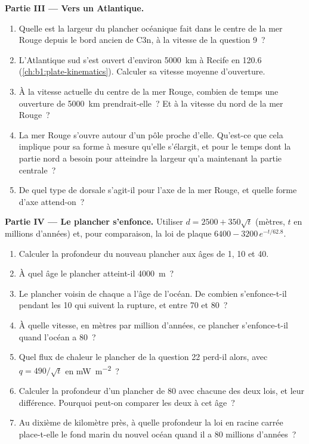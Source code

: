 \begin{problem}
\medskip
\noindent\textbf{Partie III --- Vers un Atlantique.}
\begin{enumerate}[resume]
  \item Quelle est la largeur du plancher océanique fait dans le centre de la mer Rouge depuis le
        bord ancien de C3n, à la vitesse de la question 9~?
  \item L'Atlantique sud s'est ouvert d'environ \qty{5000}{km} à Recife en
        \qty{120.6}{\Ma} (\cref{ch:b1:plate-kinematics}). Calculer sa vitesse
        moyenne d'ouverture.
  \item À la vitesse actuelle du centre de la mer Rouge, combien de temps une ouverture
        de \qty{5000}{km} prendrait-elle~? Et à la vitesse du nord de la mer Rouge~?
  \item La mer Rouge s'ouvre autour d'un pôle proche d'elle. Qu'est-ce que cela implique pour
        sa forme à mesure qu'elle s'élargit, et pour le temps dont la partie nord a besoin pour
        atteindre la largeur qu'a maintenant la partie centrale~?
  \item De quel type de dorsale s'agit-il pour l'axe de la mer Rouge, et quelle forme d'axe
        attend-on~?
\end{enumerate}

\medskip
\noindent\textbf{Partie IV --- Le plancher s'enfonce.} Utiliser $d = 2500 + 350\sqrt t$
(mètres, $t$ en millions d'années) et, pour comparaison, la loi de plaque
$6400 - 3200\,e^{-t/62.8}$.
\begin{enumerate}[resume]
  \item Calculer la profondeur du nouveau plancher aux âges de 1, 10 et
        \qty{40}{\Ma}.
  \item À quel âge le plancher atteint-il \qty{4000}{m}~?
  \item Le plancher voisin de chaque  a l'âge de l'océan. De combien
        s'enfonce-t-il pendant les \qty{10}{\Ma} qui suivent la rupture, et entre
        70 et \qty{80}{\Ma}~?
  \item À quelle vitesse, en mètres par million d'années, ce plancher s'enfonce-t-il quand
        l'océan a \qty{80}{\Ma}~?
  \item Quel flux de chaleur le plancher de la question 22 perd-il alors, avec
        $q = 490/\sqrt t$ en \unit{mW.m^{-2}}~?
  \item Calculer la profondeur d'un plancher de \qty{80}{\Ma} avec chacune des deux
        lois, et leur différence. Pourquoi peut-on comparer les deux à cet âge~?
  \item Au dixième de kilomètre près, à quelle profondeur la loi en racine carrée
        place-t-elle le fond marin du nouvel océan quand il a 80 millions d'années~?
\end{enumerate}
\end{problem}

